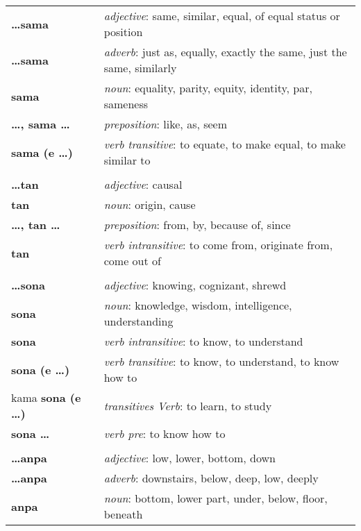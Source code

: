 \begin{supertabular}{p{2,5cm}|ll}
\textbf{\dots sama} && \textit{adjective}: same, similar, equal, of equal status or position \\ %
\textbf{\dots sama} && \textit{adverb}: just as, equally, exactly the same, just the same, similarly \\ %
\textbf{sama} && \textit{noun}: equality, parity, equity, identity, par, sameness \\ %
\textbf{\dots , sama \dots} && \textit{preposition}: like, as, seem \\ %
\textbf{sama (e \dots)} && \textit{verb transitive}: to equate, to make equal, to make similar to \\ %
 && \\ %
\textbf{\dots tan} && \textit{adjective}: causal \\ %
\textbf{tan} && \textit{noun}: origin, cause \\ %
\textbf{\dots , tan \dots} && \textit{preposition}: from, by, because of, since \\ %
\textbf{tan} && \textit{verb intransitive}: to come from, originate from, come out of \\ %
 && \\ %
\textbf{\dots sona} && \textit{adjective}: knowing, cognizant, shrewd \\ %
\textbf{sona} && \textit{noun}: knowledge, wisdom, intelligence, understanding \\ %
\textbf{sona} && \textit{verb intransitive}: to know, to understand \\ %
\textbf{sona (e \dots)} && \textit{verb transitive}: to know, to understand, to know how to \\ %
kama \textbf{sona (e \dots)} && \textit{transitives Verb}: to learn, to study \\ %
\textbf{sona \dots} && \textit{verb pre}: to know how to \\ %
 && \\ %
\textbf{\dots anpa} && \textit{adjective}: low, lower, bottom, down \\ %
\textbf{\dots anpa} && \textit{adverb}: downstairs, below, deep, low, deeply \\ %
\textbf{anpa} && \textit{noun}: bottom, lower part, under, below, floor, beneath \\ %

\end{supertabular}
